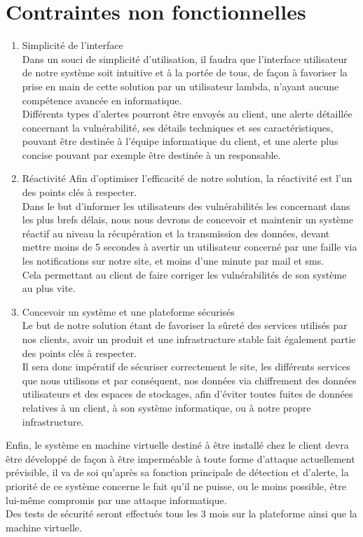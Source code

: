 \section{Contraintes non fonctionnelles}
\begin{enumerate}
\item Simplicité de l'interface\\
 Dans un souci de simplicité d'utilisation, il faudra que l'interface utilisateur de notre système soit intuitive et à la portée de tous, de façon à favoriser la prise en main de cette solution par un utilisateur lambda, n'ayant aucune compétence avancée en informatique.\\
 Différents types d'alertes pourront être envoyés au client, une alerte détaillée concernant la vulnérabilité, ses détails techniques et ses caractéristiques, pouvant être destinée à l'équipe informatique du client, et une alerte plus concise pouvant par exemple être destinée à un responsable.\\
\item Réactivité
  Afin d'optimiser l'efficacité de notre solution, la réactivité est l'un des points clés à respecter.\\
  Dans le but d'informer les utilisateurs des vulnérabilités les concernant dans les plus brefs délais, nous nous devrons de concevoir et maintenir un système réactif au niveau la récupération et la transmission des données, devant mettre moins de 5 secondes à avertir un utilisateur concerné par une faille via les notifications sur notre site, et moins d’une minute par mail et sms.\\
  Cela permettant au client de faire corriger les vulnérabilités de son système au plus vite.\\
\item Concevoir un système et une plateforme sécurisés\\
  Le but de notre solution étant de favoriser la sûreté des services utilisés par nos clients, avoir un produit et une infrastructure stable fait également partie des points clés à respecter.\\
  Il sera donc impératif de sécuriser correctement le site, les différents services que nous utilisons et par conséquent, nos données via chiffrement des données utilisateurs et des espaces de stockages, afin d'éviter toutes fuites de données relatives à un client, à son système informatique, ou à notre propre infrastructure.\\ 
\end{enumerate}
Enfin, le système en machine virtuelle destiné à être installé chez le client devra être développé de façon à être imperméable à toute forme d'attaque actuellement prévisible, il va de soi qu'après sa fonction principale de détection et d'alerte, la priorité de ce système concerne le fait qu'il ne puisse, ou le moins possible, être lui-même compromis par une attaque informatique.\\
Des tests de sécurité seront effectués tous les 3 mois sur la plateforme ainsi que la machine virtuelle.\\
